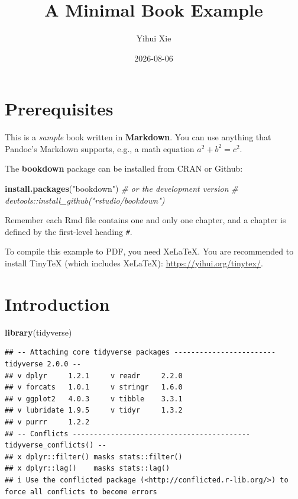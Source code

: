 \documentclass[
]{book}
\title{A Minimal Book Example}
\author{Yihui Xie}
\date{2026-08-06}
\newenvironment{Shaded}{\begin{snugshade}}{\end{snugshade}}
\newcommand{\CommentTok}[1]{\textcolor[rgb]{0.56,0.35,0.01}{\textit{#1}}}
\newcommand{\FunctionTok}[1]{\textcolor[rgb]{0.13,0.29,0.53}{\textbf{#1}}}
\newcommand{\NormalTok}[1]{#1}
\newcommand{\StringTok}[1]{\textcolor[rgb]{0.31,0.60,0.02}{#1}}
\begin{document}
\maketitle

{
\setcounter{tocdepth}{1}
\tableofcontents
}
\chapter{Prerequisites}\label{prerequisites}

This is a \emph{sample} book written in \textbf{Markdown}. You can use anything that Pandoc's Markdown supports, e.g., a math equation \(a^2 + b^2 = c^2\).

The \textbf{bookdown} package can be installed from CRAN or Github:

\begin{Shaded}
\begin{Highlighting}[]
\FunctionTok{install.packages}\NormalTok{(}\StringTok{"bookdown"}\NormalTok{)}
\CommentTok{\# or the development version}
\CommentTok{\# devtools::install\_github("rstudio/bookdown")}
\end{Highlighting}
\end{Shaded}

Remember each Rmd file contains one and only one chapter, and a chapter is defined by the first-level heading \texttt{\#}.

To compile this example to PDF, you need XeLaTeX. You are recommended to install TinyTeX (which includes XeLaTeX): \url{https://yihui.org/tinytex/}.

\chapter{Introduction}\label{intro}

\begin{Shaded}
\begin{Highlighting}[]
\FunctionTok{library}\NormalTok{(tidyverse)}
\end{Highlighting}
\end{Shaded}

\begin{verbatim}
## -- Attaching core tidyverse packages ------------------------ tidyverse 2.0.0 --
## v dplyr     1.2.1     v readr     2.2.0
## v forcats   1.0.1     v stringr   1.6.0
## v ggplot2   4.0.3     v tibble    3.3.1
## v lubridate 1.9.5     v tidyr     1.3.2
## v purrr     1.2.2     
## -- Conflicts ------------------------------------------ tidyverse_conflicts() --
## x dplyr::filter() masks stats::filter()
## x dplyr::lag()    masks stats::lag()
## i Use the conflicted package (<http://conflicted.r-lib.org/>) to force all conflicts to become errors
\end{verbatim}
\end{document}
